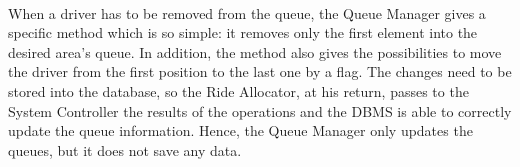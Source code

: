 \documentclass[\mainpath/main]{subfiles}
\begin{document}
\\[0.5cm]
	
When a driver has to be removed from the queue, the Queue Manager gives a specific method which is so simple: it removes only the first element into the desired area's queue. In addition, the method also gives the possibilities to move the driver from the first position to the last one by a flag. The changes need to be stored into the database, so the Ride Allocator, at his return, passes to the System Controller the results of the operations and the DBMS is able to correctly update the queue information. Hence, the Queue Manager only updates the queues, but it does not save any data.\\

\\[0.5cm]
\end{document}
